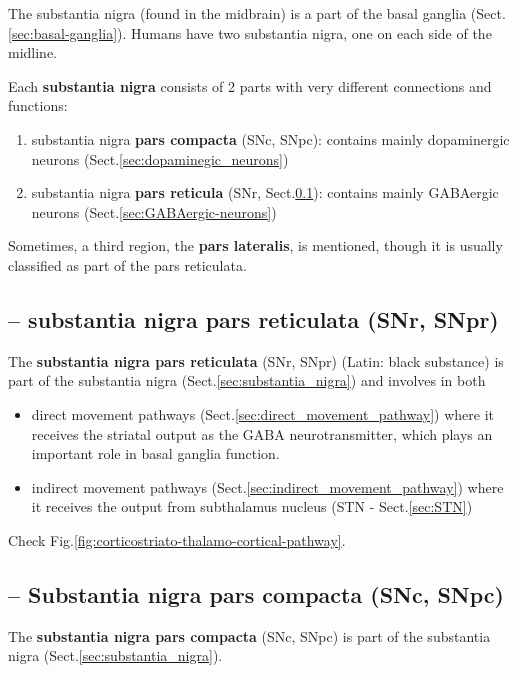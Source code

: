 The substantia nigra (found in the midbrain) is a part of the basal ganglia
(Sect.\ref{sec:basal-ganglia}).  Humans have two substantia nigra, one on each
side of the midline.

Each {\bf substantia nigra} consists of 2 parts with very different connections
and functions:
\begin{enumerate}
  \item substantia nigra {\bf pars compacta} (SNc, SNpc): contains mainly
  dopaminergic neurons (Sect.\ref{sec:dopaminegic_neurons})
  
  \item substantia nigra {\bf pars reticula} (SNr, Sect.\ref{sec:SNr}): contains
  mainly GABAergic neurons (Sect.\ref{sec:GABAergic-neurons})
\end{enumerate}
Sometimes, a third region, the {\bf pars lateralis}, is mentioned, though it is
usually classified as part of the pars reticulata.

\subsection{-- substantia nigra pars reticulata (SNr, SNpr)}
\label{sec:SNr}
\label{sec:SNpr}

The {\bf substantia nigra pars reticulata} (SNr, SNpr) (Latin: black substance)
is part of the substantia nigra (Sect.\ref{sec:substantia_nigra}) and involves
in both 
\begin{itemize}
  \item  direct movement pathways (Sect.\ref{sec:direct_movement_pathway})
where it receives the striatal output as the GABA neurotransmitter,
which plays an important role in basal ganglia function.

  \item indirect movement pathways (Sect.\ref{sec:indirect_movement_pathway})
where it receives the output from subthalamus nucleus (STN - Sect.\ref{sec:STN}) 
\end{itemize}
Check Fig.\ref{fig:corticostriato-thalamo-cortical-pathway}.


\subsection{-- Substantia nigra pars compacta (SNc, SNpc)}
\label{sec:SNpc}
\label{sec:SNc}

The {\bf substantia nigra pars compacta} (SNc, SNpc) is part of the substantia
nigra (Sect.\ref{sec:substantia_nigra}).

